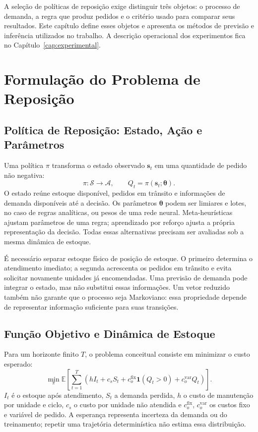 
A seleção de políticas de reposição exige distinguir três objetos: o processo de demanda, a regra que produz pedidos e o critério usado para comparar seus resultados. Este capítulo define esses objetos e apresenta os métodos de previsão e inferência utilizados no trabalho. A descrição operacional dos experimentos fica no Capítulo~\ref{cap:experimental}.

\section{Formulação do Problema de Reposição}
\label{sec:formulacao_problema}
\subsection{Política de Reposição: Estado, Ação e Parâmetros}
\label{sec:estado_acao_parametros}

Uma política $\pi$ transforma o estado observado $\mathbf{s}_t$ em uma quantidade de pedido não negativa:
\[
\pi:\mathcal S\rightarrow\mathcal A,\qquad Q_t=\pi(\mathbf{s}_t;\boldsymbol\theta).
\]
O estado reúne estoque disponível, pedidos em trânsito e informações de demanda disponíveis até a decisão. Os parâmetros $\boldsymbol\theta$ podem ser limiares e lotes, no caso de regras analíticas, ou pesos de uma rede neural. Meta-heurísticas ajustam parâmetros de uma regra; aprendizado por reforço ajusta a própria representação da decisão. Todas essas alternativas precisam ser avaliadas sob a mesma dinâmica de estoque.

É necessário separar estoque físico de posição de estoque. O primeiro determina o atendimento imediato; a segunda acrescenta os pedidos em trânsito e evita solicitar novamente unidades já encomendadas. Uma previsão de demanda pode integrar o estado, mas não substitui essas informações. Um vetor reduzido também não garante que o processo seja Markoviano: essa propriedade depende de representar informação suficiente para suas transições.

\subsection{Função Objetivo e Dinâmica de Estoque}
\label{sec:funcao_objetivo}

Para um horizonte finito $T$, o problema conceitual consiste em minimizar o custo esperado:
\begin{equation}
\min_\pi\mathbb E\left[\sum_{t=1}^{T}\left(hI_t+c_sS_t+c_o^{\mathrm{fix}}\mathbf1(Q_t>0)+c_o^{\mathrm{var}}Q_t\right)\right].
\label{eq:obj_inv_control}
\end{equation}
$I_t$ é o estoque após atendimento, $S_t$ a demanda perdida, $h$ o custo de manutenção por unidade e ciclo, $c_s$ o custo por unidade não atendida e $c_o^{\mathrm{fix}}$, $c_o^{\mathrm{var}}$ os custos fixo e variável de pedido. A esperança representa incerteza da demanda ou do treinamento; repetir uma trajetória determinística não estima essa distribuição.

